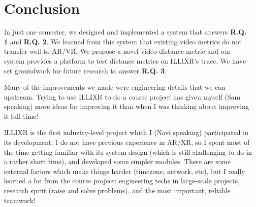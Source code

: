 

\section{Conclusion}

In just one semester, we designed and implemented a system that answers \textbf{R.Q. 1} and \textbf{R.Q. 2}.
We learned from this system that existing video metrics do not transfer well to AR/VR.
We propose a novel video distance metric and our system provides a platform to test distance metrics on ILLIXR's trace.
We have set groundwork for future research to answer \textbf{R.Q. 3}.

Many of the improvements we made were engineering details that we can upstream. Trying to use ILLIXR to do a course project has given myself (Sam speaking) more ideas for improving it than when I was thinking about improving it full-time!

ILLIXR is the first industry-level project which I (Navi speaking) participated in its development. I do not have previous experience in AR/XR, so I spent most of the time getting familiar with its system design (which is still challenging to do in a rather short time), and developed some simpler modules. There are some external factors which make things harder (timezone, network, etc), but I really learned a lot from the course project: engineering techs in large-scale projects, research spirit (raise and solve problems), and the most important, reliable teamwork!

